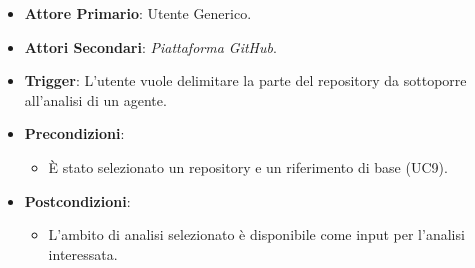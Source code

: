 \documentclass[12pt, a4paper]{article}
\begin{document}
\begin{itemize}
    \item \textbf{Attore Primario}: Utente Generico.

    \item \textbf{Attori Secondari}: \textit{Piattaforma GitHub}.

    \item \textbf{Trigger}: L'utente vuole delimitare la parte del repository da sottoporre all'analisi di un agente.

    \item \textbf{Precondizioni}:
    \begin{itemize}
        \item È stato selezionato un repository e un riferimento di base (UC9).
    \end{itemize}
    
    \item \textbf{Postcondizioni}:\begin{itemize}\item L'ambito di analisi selezionato è disponibile come input per l'analisi interessata.\end{itemize}


\end{itemize}
\end{document}
